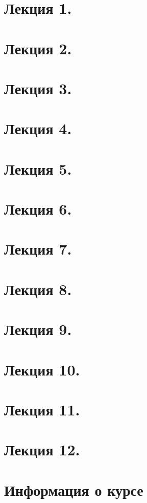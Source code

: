 \newpage
\section{Лекция 1.}


\newpage
\section{Лекция 2.}


\newpage
\section{Лекция 3.}


\newpage
\section{Лекция 4.}


\newpage
\section{Лекция 5.}


\newpage
\section{Лекция 6.}


\newpage
\section{Лекция 7.}


\newpage
\section{Лекция 8.}


\newpage
\section{Лекция 9.}

\newpage
\section{Лекция 10.}

\newpage
\section{Лекция 11.}

\newpage
\section{Лекция 12.}


\newpage
\section{Информация о курсе}
